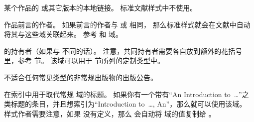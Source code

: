 \begin{fieldlist}

某个作品的  或其它版本的本地链接。
标准文献样式中不使用。




作品前言的作者。
如果前言的作者与  或  相同，
那么标准样式就会在文献中自动将其与这些域关联起来。
参考  和  域。




 的持有者（如果与  不同的话）。
注意，共同持有者需要各自放到额外的花括号里，参考  节。
该域可以用于  节所列的定制类型中。




不适合任何常见类型的非常规出版物的出版公告。




在索引中用于取代常规  域的标题。
如果你有一个带有“An Introduction to~\dots”之类标题的条目，并且想索引为“Introduction to~\dots, An”，那么就可以使用该域。
样式作者需要注意，如果  没有定义，那么 \biblatex 会自动将  域的值复制给 。


\end{fieldlist}
